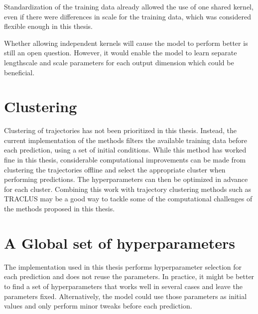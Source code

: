 Standardization of the training data already allowed the use of one shared kernel, even if there were differences in scale for the training data, which was considered flexible enough in this thesis.

Whether allowing independent kernels will cause the model to perform better is still an open question. However, it would enable the model to learn separate lengthscale and scale parameters for each output dimension which could be beneficial. 

\section{Clustering}
Clustering of trajectories has not been prioritized in this thesis. Instead, the current implementation of the methods filters the available training data before each prediction, using a set of initial conditions. While this method has worked fine in this thesis, considerable computational improvements can be made from clustering the trajectories offline and select the appropriate cluster when performing predictions. The hyperparameters can then be optimized in advance for each cluster. Combining this work with trajectory clustering methods such as TRACLUS \cite{traclus} may be a good way to tackle some of the computational challenges of the methods proposed in this thesis.

\section{A Global set of hyperparameters}
The implementation used in this thesis performs hyperparameter selection for each prediction and does not reuse the parameters. In practice, it might be better to find a set of hyperparameters that works well in several cases and leave the parameters fixed. Alternatively, the model could use those parameters as initial values and only perform minor tweaks before each prediction. 

